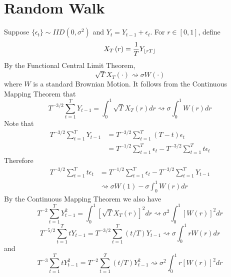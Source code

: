\documentclass[11pt]{article}
\DeclarePairedDelimiter\floor{\lfloor}{\rfloor}
\begin{document}
\section{Random Walk}
Suppose $\{ \epsilon_t \} \sim IID \left( 0 , \sigma^2 \right)$ and $Y_t = Y_{t-1} + \epsilon_t$. For $r \in \left[0,1\right]$, define
\begin{equation}
X_T \left( r \right) = \frac{1}{T}Y_{\floor{rT}}
\end{equation}
By the Functional Central Limit Theorem,
\begin{equation}
\sqrt{T} X_T \left( \cdot \right) \rightsquigarrow \sigma W \left( \cdot \right)
\end{equation}
where $W$ is a standard Brownian Motion. It follows from the Continuous Mapping Theorem that
\begin{equation}
T^{-3/2} \sum_{t=1}^T Y_{t-1} = \int_0^1 \sqrt{T} X_T \left( r \right) dr \rightsquigarrow \sigma \int_0^1 W \left( r \right) dr
\end{equation}
Note that
\begin{equation}
\begin{split}
T^{-3/2} \sum_{t=1}^T Y_{t-1}
& = T^{-3/2} \sum_{t=1}^T \left(T-t\right) \epsilon_t \\
& = T^{-1/2} \sum_{t=1}^T \epsilon_t - T^{-3/2} \sum_{t=1}^T t \epsilon_t
\end{split}
\end{equation}
Therefore
\begin{equation}
\begin{split}
T^{-3/2} \sum_{t=1}^T t \epsilon_t
& = T^{-1/2} \sum_{t=1}^T \epsilon_t - T^{-3/2} \sum_{t=1}^T Y_{t-1} \\
& \rightsquigarrow \sigma W \left( 1 \right) - \sigma \int_0^1 W \left( r \right) dr
\end{split}
\end{equation}
By the Continuous Mapping Theorem we also have
\begin{equation}
T^{-2} \sum_{t=1}^T Y_{t-1}^2 = \int_0^1 \left[ \sqrt{T} X_T \left( r \right) \right]^2 dr \rightsquigarrow \sigma^2 \int_0^1 \left[ W \left( r \right) \right]^2 dr
\end{equation}
\begin{equation}
T^{-5/2} \sum_{t=1}^T t Y_{t-1} = T^{-3/2} \sum_{t=1}^T \left( t/T \right) Y_{t-1} \rightsquigarrow \sigma \int_0^1 r W \left( r \right) dr
\end{equation}
and
\begin{equation}
T^{-3} \sum_{t=1}^T t Y_{t-1}^2 = T^{-2} \sum_{t=1}^T \left( t/T \right) Y_{t-1}^2 \rightsquigarrow \sigma^2 \int_0^1 r \left[ W \left(r \right) \right]^2 dr
\end{equation}
\end{document}
